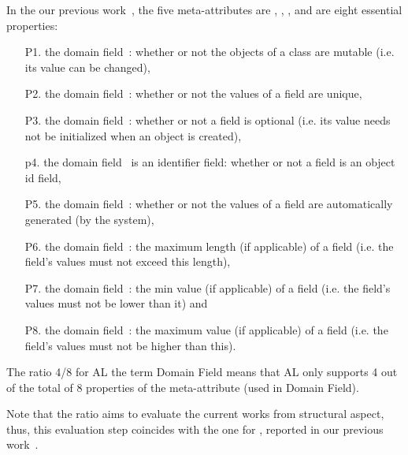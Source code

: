 	In the our previous work~\cite{le_domain_2018}, the five meta-attributes are , , ,  and  are eight  essential properties: 
	\begin{enumerate}
		\item[P1.] the domain field~: whether or not the objects of a class are mutable  (i.e. its value can be changed),
		\item[P2.] the domain field~: whether or not the values of a field are unique,
		\item[P3.] the domain field~: whether or not a field is optional (i.e. its value needs not be initialized when an object is created),
		\item[p4.] the domain field~ is an identifier field: whether or not a field is an object id field,
		\item[P5.] the domain field~: whether or not the values of a field are automatically generated (by the system),
		\item[P6.] the domain field~: the maximum length (if applicable) of a field (i.e. the field’s values must not exceed this length),
		\item[P7.] the domain field~:  the min value (if applicable) of a field (i.e. the field’s values must not be lower than it) and
		\item[P8.] the domain field~:  the maximum value (if applicable) of a field (i.e. the field’s values must not be higher than this).
				
	\end{enumerate}
	The ratio 4/8 for AL \wrt the term Domain Field means that AL only supports 4 out of the total of 8 properties of the meta-attribute  (used in Domain Field). 
	
	Note that the ratio aims to evaluate the current works from structural aspect, thus, this evaluation step coincides with the one for \dcsl, reported in our previous work~\cite{le_domain_2018}. %
	
